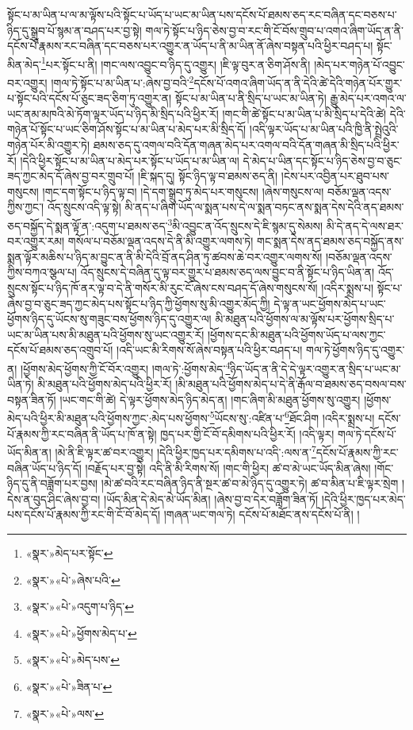 སྟོང་པ་མ་ཡིན་པ་ལ་མ་ལྟོས་པའི་སྟོང་པ་ཡོད་པ་ཡང་མ་ཡིན་པས་དངོས་པོ་ཐམས་ཅད་རང་བཞིན་དང་བཅས་པ་ཉིད་དུ་སྒྲུབ་པོ་སྙམ་ན་བཤད་པར་བྱ་སྟེ། གལ་ཏེ་སྟོང་པ་ཉིད་ཅེས་བྱ་བ་རང་གི་ངོ་བོས་གྲུབ་པ་འགའ་ཞིག་ཡོད་ན་ནི་དངོས་པོ་རྣམས་རང་བཞིན་དང་བཅས་པར་འགྱུར་ན་ཡོད་པ་ནི་མ་ཡིན་ནོ་ཞེས་བསྟན་པའི་ཕྱིར་བཤད་པ། སྟོང་མིན་མེད་\footnote{«སྣར་»མེད་པར་སྟོང་}པར་སྟོང་པ་ནི། །གང་ལས་འབྱུང་བ་ཉིད་དུ་འགྱུར། །ཇི་ལྟ་བུར་ན་ཅིག་ཤོས་ནི། །མེད་པར་གཉེན་པོ་འབྱུང་བར་འགྱུར། །གལ་ཏེ་སྟོང་པ་མ་ཡིན་པ་:ཞེས་བྱ་བའི་\footnote{«སྣར་»«པེ་»ཞེས་པའི་}དངོས་པོ་འགའ་ཞིག་ཡོད་ན་ནི་དེའི་ཚེ་དེའི་གཉེན་པོར་གྱུར་པ་སྟོང་པའི་དངོས་པོ་ཅུང་ཟད་ཅིག་ཏུ་འགྱུར་ན། སྟོང་པ་མ་ཡིན་པ་ནི་སྲིད་པ་ཡང་མ་ཡིན་ཏེ། རྒྱུ་མེད་པར་འགའ་ལ་ཡང་ནམ་མཁའི་མེ་ཏོག་ལྟར་ཡོད་པ་ཉིད་མི་སྲིད་པའི་ཕྱིར་རོ། །གང་གི་ཚེ་སྟོང་པ་མ་ཡིན་པ་མི་སྲིད་པ་དེའི་ཚེ། དེའི་གཉེན་པོ་སྟོང་པ་ཡང་ཅིག་ཤོས་སྟོང་པ་མ་ཡིན་པ་མེད་པར་མི་སྲིད་དོ། །འདི་ལྟར་ཡོད་པ་མ་ཡིན་པའི་ཁྱི་ནི་སྤྲེའུའི་གཉེན་པོར་མི་འགྱུར་ཏེ། ཐམས་ཅད་དུ་འགལ་བའི་དོན་གཞན་མེད་པར་འགལ་བའི་དོན་གཞན་མི་སྲིད་པའི་ཕྱིར་རོ། །དེའི་ཕྱིར་སྟོང་པ་མ་ཡིན་པ་མེད་པར་སྟོང་པ་ཡོད་པ་མ་ཡིན་ལ། དེ་མེད་པ་ཡིན་དང་སྟོང་པ་ཉིད་ཅེས་བྱ་བ་ཅུང་ཟད་ཀྱང་མེད་དོ་ཞེས་བྱ་བར་གྲུབ་པོ། །ཇི་སྐད་དུ། སྟོང་ཉིད་ལྟ་བ་ཐམས་ཅད་ནི། །ངེས་པར་འབྱིན་པར་ཐུབ་པས་གསུངས། །གང་དག་སྟོང་པ་ཉིད་ལྟ་བ། །དེ་དག་སྒྲུབ་ཏུ་མེད་པར་གསུངས། །ཞེས་གསུངས་ལ། བཅོམ་ལྡན་འདས་ཀྱིས་ཀྱང་། འོད་སྲུངས་འདི་ལྟ་སྟེ། མི་ནད་པ་ཞིག་ཡོད་ལ་སྨན་པས་དེ་ལ་སྨན་བཏང་ནས་སྨན་དེས་དེའི་ནད་ཐམས་ཅད་བསྐྱོད་དེ་སྨན་ལྟོ་ན་:འདུག་པ་ཐམས་ཅད་\footnote{«སྣར་»«པེ་»འདུག་པ་ཉིད་}མི་འབྱུང་ན་འོད་སྲུངས་དེ་ཇི་སྙམ་དུ་སེམས། མི་དེ་ནད་དེ་ལས་ཐར་བར་འགྱུར་རམ། གསོལ་པ་བཅོམ་ལྡན་འདས་དེ་ནི་མི་འགྱུར་ལགས་ཏེ། གང་སྨན་དེས་ནད་ཐམས་ཅད་བསྐྱོད་ནས་སྨན་ལྟོར་མཆིས་པ་ཉིད་མ་བྱུང་ན་ནི་མི་དེའི་བྲོ་ནད་ཤིན་ཏུ་ཚབས་ཆེ་བར་འགྱུར་ལགས་སོ། །བཅོམ་ལྡན་འདས་ཀྱིས་བཀའ་སྩལ་པ། འོད་སྲུངས་དེ་བཞིན་དུ་ལྟ་བར་གྱུར་པ་ཐམས་ཅད་ལས་བྱུང་བ་ནི་སྟོང་པ་ཉིད་ཡིན་ན། འོད་སྲུངས་སྟོང་པ་ཉིད་ཁོ་ནར་ལྟ་བ་དེ་ནི་གསོར་མི་རུང་ངོ་ཞེས་ངས་བཤད་དོ་ཞེས་གསུངས་སོ། །འདིར་སྨྲས་པ། སྟོང་པ་ཞེས་བྱ་བ་ཅུང་ཟད་ཀྱང་མེད་པས་སྟོང་པ་ཉིད་ཀྱི་ཕྱོགས་སུ་མི་འགྱུར་མོད་ཀྱི། དེ་ལྟ་ན་ཡང་ཕྱོགས་མེད་པ་ཡང་ཕྱོགས་ཉིད་དུ་ཡོངས་སུ་གཟུང་བས་ཕྱོགས་ཉིད་དུ་འགྱུར་ལ། མི་མཐུན་པའི་ཕྱོགས་ལ་མ་ལྟོས་པར་ཕྱོགས་སྲིད་པ་ཡང་མ་ཡིན་པས་མི་མཐུན་པའི་ཕྱོགས་སུ་ཡང་འགྱུར་རོ། །ཕྱོགས་དང་མི་མཐུན་པའི་ཕྱོགས་ཡོད་པ་ལས་ཀྱང་དངོས་པོ་ཐམས་ཅད་འགྲུབ་པོ། །འདི་ཡང་མི་རིགས་སོ་ཞེས་བསྟན་པའི་ཕྱིར་བཤད་པ། གལ་ཏེ་ཕྱོགས་ཉིད་དུ་འགྱུར་ན། །ཕྱོགས་མེད་ཕྱོགས་ཀྱི་ངོ་བོར་འགྱུར། །གལ་ཏེ་:ཕྱོགས་མེད་\footnote{«སྣར་»«པེ་»ཕྱོགས་མེད་པ་}ཉིད་ཡོད་ན་ནི་དེ་དེ་ལྟར་འགྱུར་ན་སྲིད་པ་ཡང་མ་ཡིན་ཏེ། མི་མཐུན་པའི་ཕྱོགས་མེད་པའི་ཕྱིར་རོ། །མི་མཐུན་པའི་ཕྱོགས་མེད་པ་དེ་ནི་རྒོལ་བ་ཐམས་ཅད་བསལ་བས་བསྟན་ཟིན་ཏོ། །ཡང་གང་གི་ཚེ། དེ་ལྟར་ཕྱོགས་མེད་ཉིད་མེད་ན། །གང་ཞིག་མི་མཐུན་ཕྱོགས་སུ་འགྱུར། །ཕྱོགས་མེད་པའི་ཕྱིར་མི་མཐུན་པའི་ཕྱོགས་ཀྱང་:མེད་པས་ཕྱོགས་\footnote{«སྣར་»«པེ་»མེད་པས་}ཡོངས་སུ་:འཛིན་པ་\footnote{«སྣར་»«པེ་»ཟིན་པ་}ཐོང་ཤིག །འདིར་སྨྲས་པ། དངོས་པོ་རྣམས་ཀྱི་རང་བཞིན་ནི་ཡོད་པ་ཁོ་ན་སྟེ། ཁྱད་པར་གྱི་ངོ་བོ་དམིགས་པའི་ཕྱིར་རོ། །འདི་ལྟར། གལ་ཏེ་དངོས་པོ་ཡོད་མིན་ན། །མེ་ནི་ཇི་ལྟར་ཚ་བར་འགྱུར། །དེའི་ཕྱིར་ཁྱད་པར་དམིགས་པ་འདི་:ལས་ན་\footnote{«སྣར་»«པེ་»ལས་}དངོས་པོ་རྣམས་ཀྱི་རང་བཞིན་ཡོད་པ་ཉིད་དོ། །བརྗོད་པར་བྱ་སྟེ། འདི་ནི་མི་རིགས་སོ། །གང་གི་ཕྱིར། ཚ་བ་མེ་ཡང་ཡོད་མིན་ཞེས། །གོང་ཉིད་དུ་ནི་བཟློག་པར་བྱས། །མེ་ཚ་བའི་རང་བཞིན་ཉིད་ནི་སྔར་ཚ་བ་མེ་ཉིད་དུ་འགྱུར་ཏེ། ཚ་བ་མིན་པ་ཇི་ལྟར་སྲེག །དེས་ན་བུད་ཤིང་ཞེས་བྱ་བ། །ཡོད་མིན་དེ་མེད་མེ་ཡོད་མིན། །ཞེས་བྱ་བ་དེར་བཟློག་ཟིན་ཏོ། །དེའི་ཕྱིར་ཁྱད་པར་མེད་པས་དངོས་པོ་རྣམས་ཀྱི་རང་གི་ངོ་བོ་མེད་དོ། །གཞན་ཡང་གལ་ཏེ། དངོས་པོ་མཐོང་ནས་དངོས་པོ་ནི། །
